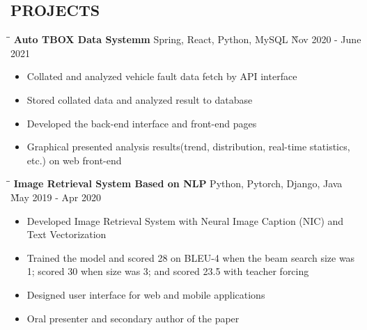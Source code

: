 \documentclass{res}
\begin{document}
\begin{resume}
\vspace{-0.12in}
\section{PROJECTS}

    \vspace{-0.1in}	 
    \begin{tabbing}
    \hspace{3in}\= \hspace{2in}\= \kill %
    {\bf Auto TBOX Data Systemm} \> Spring, React, Python, MySQL \` Nov 2020 - June 2021 \\
    \end{tabbing}\vspace{-20pt}      %
    \begin{itemize} \itemsep -2pt %
    \item Collated and analyzed vehicle fault data fetch by API interface
    \item Stored collated data and analyzed result to database
    \item Developed the back-end interface and front-end pages
    \item Graphical presented analysis results(trend, distribution, real-time statistics, etc.) on web front-end
    \end{itemize}

    \vspace{-0.2in}	
    \begin{tabbing}
    \hspace{3in}\= \hspace{2in}\= \kill %
    {\bf Image Retrieval System Based on NLP} \> Python, Pytorch, Django, Java \` May 2019 - Apr 2020 \\
    \end{tabbing}\vspace{-20pt}      %
    \begin{itemize} \itemsep -2pt %
    \item Developed Image Retrieval System with Neural Image Caption (NIC) and Text Vectorization
    \item Trained the model and scored 28 on BLEU-4 when the beam search size was 1; scored 30 when size was 3; and scored 23.5 with teacher forcing
    \item Designed user interface for web and mobile applications 
    \item Oral presenter and secondary author of the paper
    \end{itemize}


\end{resume}
\end{document}
